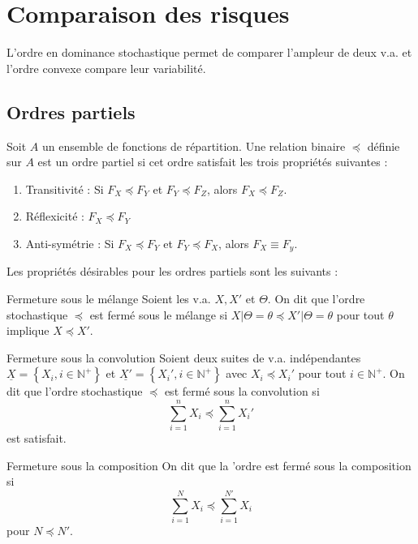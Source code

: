 \chapter{Comparaison des risques}

L'ordre en dominance stochastique permet de comparer l'ampleur de deux v.a. et l'ordre convexe compare leur variabilité. 

\section{Ordres partiels}

\begin{definition}{}{}
	Soit $A$ un ensemble de fonctions de répartition. Une relation binaire $\preceq$ définie sur $A$ est un ordre partiel si cet ordre satisfait les trois propriétés suivantes : \begin{enumerate}
		\item Transitivité : Si $F_X \preceq F_Y$ et $F_Y \preceq F_Z$, alors $F_X \preceq F_Z$. 
		\item Réflexicité : $F_X \preceq F_Y$
		\item Anti-symétrie : Si $F_X \preceq F_Y$ et $F_Y \preceq F_X$, alors $F_X \equiv F_y$.
	\end{enumerate}
\end{definition}

Les propriétés désirables pour les ordres partiels sont les suivants : 

\begin{propriete}{Fermeture sous le mélange}{}
	Soient les v.a. $X, X'$ et $\Theta$. On dit que l'ordre stochastique $\preceq$ est fermé sous le mélange si $X\vert \Theta = \theta \preceq X'\vert \Theta = \theta$ pour tout $\theta$ implique $X \preceq X'$. 
\end{propriete}

\begin{propriete}{Fermeture sous la convolution}{}
	Soient deux suites de v.a. indépendantes $\underline{X} = \left\{X_i, i \in \mathbb{N}^+ \right\}$ et $\underline{X'} = \left\{X_i', i \in \mathbb{N}^+ \right\}$ avec $X_i \preceq X_i'$ pour tout $i \in \mathbb{N}^+$. On dit que l'ordre stochastique $\preceq$ est fermé sous la convolution si $$\sum_{i = 1}^{n}X_i \preceq \sum_{i = 1}^{n}X_i'$$ est satisfait.
\end{propriete}

\begin{propriete}{Fermeture sous la composition}{}
	On dit que la 'ordre est fermé sous la composition si $$\sum_{i = 1}^{N}X_i \preceq \sum_{i = 1}^{N'}X_i$$ pour $N \preceq N'$. 
\end{propriete}

